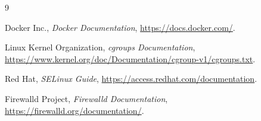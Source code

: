 \documentclass[12pt,a4paper]{report}
\begin{document}










\begin{thebibliography}{9}

Docker Inc., \textit{Docker Documentation}, 
\url{https://docs.docker.com/}.

Linux Kernel Organization, \textit{cgroups Documentation}, 
\url{https://www.kernel.org/doc/Documentation/cgroup-v1/cgroups.txt}.

Red Hat, \textit{SELinux Guide}, 
\url{https://access.redhat.com/documentation}.

Firewalld Project, \textit{Firewalld Documentation}, 
\url{https://firewalld.org/documentation/}.

\end{thebibliography}
\end{document}
